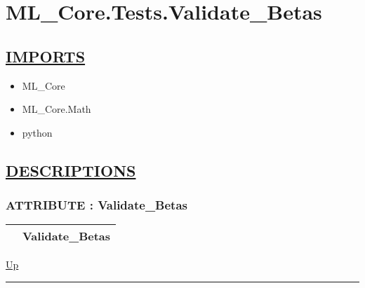 \chapter*{ML\_Core.Tests.Validate\_Betas}
\hypertarget{ecldoc:toc:ML_Core.Tests.Validate_Betas}{}

\section*{\underline{IMPORTS}}
\begin{itemize}
\item ML\_Core
\item ML\_Core.Math
\item python
\end{itemize}

\section*{\underline{DESCRIPTIONS}}
\subsection*{ATTRIBUTE : Validate\_Betas}
\hypertarget{ecldoc:ml_core.tests.validate_betas}{}

{\renewcommand{\arraystretch}{1.5}
\begin{tabularx}{\textwidth}{|>{\raggedright\arraybackslash}l|X|}
\hline
\hspace{0pt} & Validate\_Betas \\
\hline
\end{tabularx}
}

\hyperlink{ecldoc:toc:ML_Core/Tests}{Up}

\par


\rule{\textwidth}{0.4pt}
